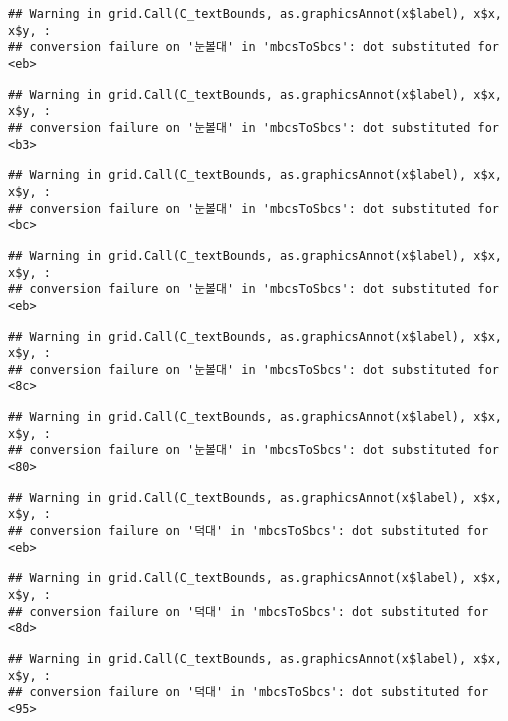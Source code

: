 \documentclass[
]{article}
\begin{document}
\begin{verbatim}
## Warning in grid.Call(C_textBounds, as.graphicsAnnot(x$label), x$x, x$y, :
## conversion failure on '눈볼대' in 'mbcsToSbcs': dot substituted for <eb>
\end{verbatim}

\begin{verbatim}
## Warning in grid.Call(C_textBounds, as.graphicsAnnot(x$label), x$x, x$y, :
## conversion failure on '눈볼대' in 'mbcsToSbcs': dot substituted for <b3>
\end{verbatim}

\begin{verbatim}
## Warning in grid.Call(C_textBounds, as.graphicsAnnot(x$label), x$x, x$y, :
## conversion failure on '눈볼대' in 'mbcsToSbcs': dot substituted for <bc>
\end{verbatim}

\begin{verbatim}
## Warning in grid.Call(C_textBounds, as.graphicsAnnot(x$label), x$x, x$y, :
## conversion failure on '눈볼대' in 'mbcsToSbcs': dot substituted for <eb>
\end{verbatim}

\begin{verbatim}
## Warning in grid.Call(C_textBounds, as.graphicsAnnot(x$label), x$x, x$y, :
## conversion failure on '눈볼대' in 'mbcsToSbcs': dot substituted for <8c>
\end{verbatim}

\begin{verbatim}
## Warning in grid.Call(C_textBounds, as.graphicsAnnot(x$label), x$x, x$y, :
## conversion failure on '눈볼대' in 'mbcsToSbcs': dot substituted for <80>
\end{verbatim}

\begin{verbatim}
## Warning in grid.Call(C_textBounds, as.graphicsAnnot(x$label), x$x, x$y, :
## conversion failure on '덕대' in 'mbcsToSbcs': dot substituted for <eb>
\end{verbatim}

\begin{verbatim}
## Warning in grid.Call(C_textBounds, as.graphicsAnnot(x$label), x$x, x$y, :
## conversion failure on '덕대' in 'mbcsToSbcs': dot substituted for <8d>
\end{verbatim}

\begin{verbatim}
## Warning in grid.Call(C_textBounds, as.graphicsAnnot(x$label), x$x, x$y, :
## conversion failure on '덕대' in 'mbcsToSbcs': dot substituted for <95>
\end{verbatim}
\end{document}
